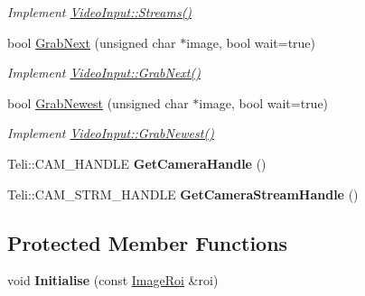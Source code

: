 \begin{DoxyCompactItemize}
\begin{DoxyCompactList}\small\item\em Implement \hyperlink{structpangolin_1_1_video_input_a9030d775d699c39ab7b7ba378c007c6a}{Video\+Input\+::\+Streams()} \end{DoxyCompactList}\item 
bool \hyperlink{classpangolin_1_1_teli_video_a29f7574bd0023de05502bb91eb8c16f6}{Grab\+Next} (unsigned char $\ast$image, bool wait=true)\hypertarget{classpangolin_1_1_teli_video_a29f7574bd0023de05502bb91eb8c16f6}{}\label{classpangolin_1_1_teli_video_a29f7574bd0023de05502bb91eb8c16f6}

\begin{DoxyCompactList}\small\item\em Implement \hyperlink{structpangolin_1_1_video_input_ad3d8ff59c1ec4139320097e6e1111f32}{Video\+Input\+::\+Grab\+Next()} \end{DoxyCompactList}\item 
bool \hyperlink{classpangolin_1_1_teli_video_af28ec505e96eb66695b05b1869046e68}{Grab\+Newest} (unsigned char $\ast$image, bool wait=true)\hypertarget{classpangolin_1_1_teli_video_af28ec505e96eb66695b05b1869046e68}{}\label{classpangolin_1_1_teli_video_af28ec505e96eb66695b05b1869046e68}

\begin{DoxyCompactList}\small\item\em Implement \hyperlink{structpangolin_1_1_video_input_a4c8ac38e3c6a3f591663aeebf645e4c6}{Video\+Input\+::\+Grab\+Newest()} \end{DoxyCompactList}\item 
Teli\+::\+C\+A\+M\+\_\+\+H\+A\+N\+D\+LE {\bfseries Get\+Camera\+Handle} ()\hypertarget{classpangolin_1_1_teli_video_a3103d81468614fbf8b3d81a363644f0f}{}\label{classpangolin_1_1_teli_video_a3103d81468614fbf8b3d81a363644f0f}

\item 
Teli\+::\+C\+A\+M\+\_\+\+S\+T\+R\+M\+\_\+\+H\+A\+N\+D\+LE {\bfseries Get\+Camera\+Stream\+Handle} ()\hypertarget{classpangolin_1_1_teli_video_a2b6aa00be8a28a60b959d810bbaaf834}{}\label{classpangolin_1_1_teli_video_a2b6aa00be8a28a60b959d810bbaaf834}

\end{DoxyCompactItemize}
\subsection*{Protected Member Functions}
\begin{DoxyCompactItemize}
\item 
void {\bfseries Initialise} (const \hyperlink{structpangolin_1_1_image_roi}{Image\+Roi} \&roi)\hypertarget{classpangolin_1_1_teli_video_a64a2efd48df09efdac4ca49702a0f628}{}\label{classpangolin_1_1_teli_video_a64a2efd48df09efdac4ca49702a0f628}

\end{DoxyCompactItemize}
